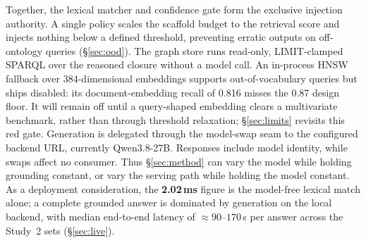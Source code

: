 \documentclass[10pt,twocolumn]{article}
\begin{document}
Together, the lexical matcher and confidence gate form the exclusive injection authority. A single policy scales the scaffold budget to the retrieval score and injects nothing below a defined threshold, preventing erratic outputs on off-ontology queries (\S\ref{sec:ood}). The graph store runs read-only, LIMIT-clamped SPARQL over the reasoned closure without a model call. An in-process HNSW fallback over 384-dimensional embeddings supports out-of-vocabulary queries but ships disabled: its document-embedding recall of 0.816 misses the 0.87 design floor. It will remain off until a query-shaped embedding clears a multivariate benchmark, rather than through threshold relaxation; \S\ref{sec:limits} revisits this red gate. Generation is delegated through the model-swap seam to the configured backend URL, currently Qwen3.8-27B. Responses include model identity, while swaps affect no consumer. Thus \S\ref{sec:method} can vary the model while holding grounding constant, or vary the serving path while holding the model constant. As a deployment consideration, the \textbf{2.02\,ms} figure is the model-free lexical match alone; a complete grounded answer is dominated by generation on the local backend, with median end-to-end latency of $\approx90$--$170$\,s per answer across the Study~2 sets (\S\ref{sec:live}).
\end{document}
